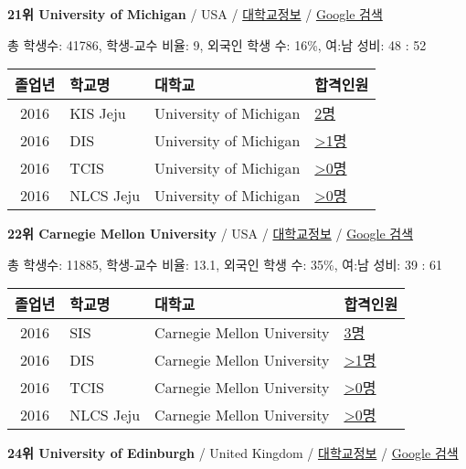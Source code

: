 \documentclass[13pt,]{article}
\begin{document}
\textbf{21위 University of Michigan} / USA /
\href{https://www.timeshighereducation.com/world-university-rankings/university-of-michigan?ranking-dataset=133819}{대학교정보}
/ \href{http://www.google.com/search?q=University+of+Michigan}{Google
검색}

총 학생수: 41786, 학생-교수 비율: 9, 외국인 학생 수: 16\%, 여:남 성비:
48 : 52

\begin{longtable}[]{@{}clll@{}}
\toprule
졸업년 & 학교명 & 대학교 & 합격인원\tabularnewline
\midrule
\endhead
2016 & KIS Jeju & University of Michigan &
\href{http://cafe.naver.com/assarabia/11596}{2명}\tabularnewline
2016 & DIS & University of Michigan &
\href{http://cafe.naver.com/assarabia/11591}{\textgreater{}1명}\tabularnewline
2016 & TCIS & University of Michigan &
\href{http://cafe.naver.com/assarabia/11598}{\textgreater{}0명}\tabularnewline
2016 & NLCS Jeju & University of Michigan &
\href{http://cafe.naver.com/assarabia/11592}{\textgreater{}0명}\tabularnewline
\bottomrule
\end{longtable}

\textbf{22위 Carnegie Mellon University} / USA /
\href{https://www.timeshighereducation.com/world-university-rankings/carnegie-mellon-university?ranking-dataset=133819}{대학교정보}
/
\href{http://www.google.com/search?q=Carnegie+Mellon+University}{Google
검색}

총 학생수: 11885, 학생-교수 비율: 13.1, 외국인 학생 수: 35\%, 여:남
성비: 39 : 61

\begin{longtable}[]{@{}clll@{}}
\toprule
졸업년 & 학교명 & 대학교 & 합격인원\tabularnewline
\midrule
\endhead
2016 & SIS & Carnegie Mellon University &
\href{http://cafe.naver.com/assarabia/11589}{3명}\tabularnewline
2016 & DIS & Carnegie Mellon University &
\href{http://cafe.naver.com/assarabia/11591}{\textgreater{}1명}\tabularnewline
2016 & TCIS & Carnegie Mellon University &
\href{http://cafe.naver.com/assarabia/11598}{\textgreater{}0명}\tabularnewline
2016 & NLCS Jeju & Carnegie Mellon University &
\href{http://cafe.naver.com/assarabia/11592}{\textgreater{}0명}\tabularnewline
\bottomrule
\end{longtable}

\textbf{24위 University of Edinburgh} / United Kingdom /
\href{https://www.timeshighereducation.com/world-university-rankings/university-of-edinburgh?ranking-dataset=133819}{대학교정보}
/ \href{http://www.google.com/search?q=University+of+Edinburgh}{Google
검색}
\end{document}
